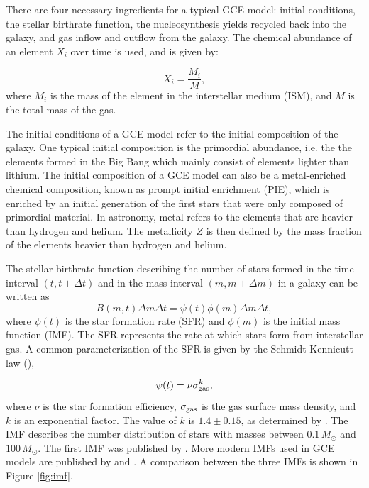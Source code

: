 \documentclass{brandeis-thesis3.2}
\def \msun {M_{\odot}}
\begin{document}
There are four necessary ingredients for a typical GCE model: initial conditions, the stellar birthrate function, the nucleosynthesis yields recycled back into the galaxy, and gas inflow and outflow from the galaxy. The chemical abundance of an element $X_i$ over time is used, and is given by:

\begin{equation} \label{eq:massfrac}
X_i = \frac{M_i}{M},
\end{equation}
where $M_i$ is the mass of the element in the interstellar medium (ISM), and $M$ is the total mass of the gas.

The initial conditions of a GCE model refer to the initial composition of the galaxy. One typical initial composition is the primordial abundance, i.e. the the elements formed in the Big Bang which mainly consist of elements lighter than lithium. The initial composition of a GCE model can also be a metal-enriched chemical composition, known as prompt initial enrichment (PIE), which is enriched by an initial generation of the first stars that were only composed of primordial material. In astronomy, metal refers to the elements that are heavier than hydrogen and helium. The metallicity $Z$ is then defined by the mass fraction of the elements heavier than hydrogen and helium.

The stellar birthrate function describing the number of stars formed in the time interval $(t, t+\Delta t)$ and in the mass interval $(m, m+\Delta m)$ in a galaxy can be written as
\begin{equation}
B(m, t) \Delta m \Delta t= \psi (t) \phi(m) \Delta m \Delta t,
\end{equation}
where $\psi (t)$ is the star formation rate (SFR) and $\phi (m)$ is the initial mass function (IMF). The SFR represents the rate at which stars form from interstellar gas. A common parameterization of the SFR is given by the Schmidt-Kennicutt law (\citealt{schmidt}),

\begin{equation}
\psi (t) = \nu \sigma_{\rm gas}^{k},
\end{equation}
where $\nu$ is the star formation efficiency, $\sigma_{\rm gas}$ is the gas surface mass density, and $k$ is an exponential factor. The value of $k$ is $1.4\pm 0.15$, as determined by \cite{kennicutt}. The IMF describes the number distribution of stars with masses between $0.1\, \msun$ and $100\, \msun$. The first IMF was published by \cite{salpeter55}. More modern IMFs used in GCE models are published by \cite{kroupa01} and \cite{chabrier03}. A comparison between the three IMFs is shown in Figure \ref{fig:imf}.
\end{document}
